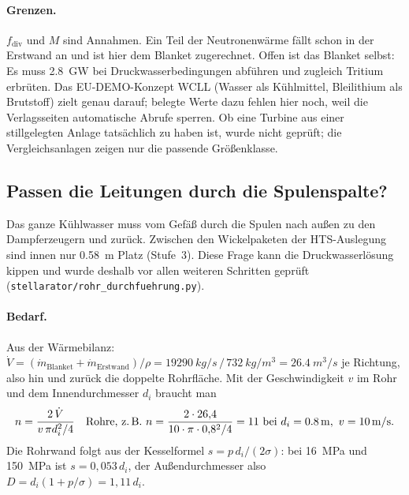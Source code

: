 \documentclass[10pt,a4paper]{article}
\begin{document}
\paragraph{Grenzen.} $f_\text{div}$ und $M$ sind Annahmen. Ein Teil der Neutronenwärme fällt schon in der Erstwand
an und ist hier dem Blanket zugerechnet. Offen ist das Blanket selbst: Es muss \SI{2,8}{GW} bei
Druckwasserbedingungen abführen und zugleich Tritium erbrüten. Das EU-DEMO-Konzept WCLL (Wasser als Kühlmittel,
Bleilithium als Brutstoff) zielt genau darauf; belegte Werte dazu fehlen hier noch, weil die Verlagsseiten
automatische Abrufe sperren. Ob eine Turbine aus einer stillgelegten Anlage tatsächlich zu haben ist, wurde
nicht geprüft; die Vergleichsanlagen zeigen nur die passende Größenklasse.



\subsection{Passen die Leitungen durch die Spulenspalte?}
Das ganze Kühlwasser muss vom Gefäß durch die Spulen nach außen zu den Dampferzeugern und zurück. Zwischen den
Wickelpaketen der HTS-Auslegung sind innen nur \SI{0,58}{m} Platz (Stufe~3). Diese Frage kann die
Druckwasserlösung kippen und wurde deshalb vor allen weiteren Schritten geprüft (\texttt{stellarator/rohr\_durchfuehrung.py}).

\paragraph{Bedarf.} Aus der Wärmebilanz: $\dot V = (\dot m_\text{Blanket} + \dot m_\text{Erstwand})/\rho =
\SI{19290}{kg/s}\,/\,\SI{732}{kg/m^3} = \SI{26,4}{m^3/s}$ je Richtung, also hin und zurück die doppelte
Rohrfläche. Mit der Geschwindigkeit $v$ im Rohr und dem Innendurchmesser $d_i$ braucht man
\[ n = \frac{2\,\dot V}{v\,\pi d_i^2/4}\quad\text{Rohre, z.\,B. } n = \frac{2\cdot 26{,}4}{10\cdot\pi\cdot 0{,}8^2/4} = 11
   \text{ bei } d_i = \SI{0,8}{m},\ v = \SI{10}{m/s}. \]
Die Rohrwand folgt aus der Kesselformel $s = p\,d_i/(2\sigma)$: bei \SI{16}{MPa} und \SI{150}{MPa} ist
$s = 0{,}053\,d_i$, der Außendurchmesser also $D = d_i(1 + p/\sigma) = 1{,}11\,d_i$.
\end{document}

